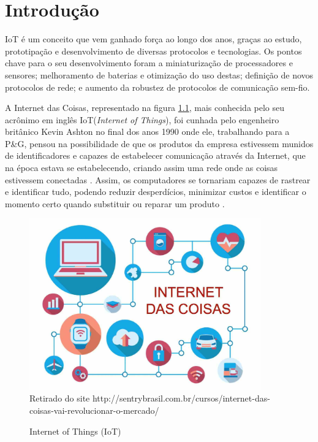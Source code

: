 \chapter[Introdução]{Introdução}
\label{cap:intro}

IoT é um conceito que vem ganhado força ao longo dos anos, graças ao estudo, prototipação e desenvolvimento de diversas protocolos e tecnologias. Os pontos chave para o seu desenvolvimento foram a miniaturização de processadores e sensores; melhoramento de baterias e otimização do uso destas; definição de novos protocolos de rede; e aumento da robustez de protocolos de comunicação sem-fio.

A Internet das Coisas, representado na figura \ref{fig:iotimg}, mais conhecida pelo seu acrônimo em inglês IoT(\textit{Internet of Things}), foi cunhada pelo engenheiro britânico Kevin Ashton no final dos anos 1990 onde ele, trabalhando para a P\&G, pensou na possibilidade de que os produtos da empresa estivessem munidos de identificadores e capazes de estabelecer comunicação através da Internet, que na época estava se estabelecendo, criando assim uma rede onde as coisas estivessem conectadas \cite{KA_IOT}. Assim, os computadores se tornariam capazes de rastrear e identificar tudo, podendo reduzir desperdícios, minimizar custos e identificar o momento certo quando substituir ou reparar um produto \cite{lopezIOT}.

\begin{figure}[ht]
    \centering
    \caption{Internet of Things (IoT)}
    \includegraphics[width=10cm]{./sections/textual/chapters/images/intro_iot.jpg}\\
    Retirado do site http://sentrybrasil.com.br/cursos/internet-das-coisas-vai-revolucionar-o-mercado/
    \label{fig:iotimg}
\end{figure}


